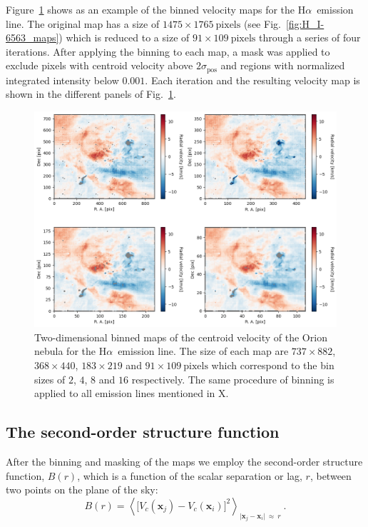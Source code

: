 \documentclass[fleqn,usenatbib, useAMS, a4paper]{mnras}
\newcommand\halpha{H${\alpha}$}
\newcommand\xx{\ensuremath{\boldsymbol{x}}}
\begin{document}
Figure~\ref{fig:figures/Ha_maps_comparison} shows as an example of the binned velocity maps for the \halpha\ emission line.
The original map has a size of \(1 475 \times1765 \ \text{pixels}\) (see Fig.~\ref{fig:H_I-6563_maps}) which is reduced to a size of \(91 \times 109 \ \text{pixels}\) through a series of four iterations.
After applying the binning to each map, a mask was applied to exclude pixels with centroid velocity above \(2\sigma_\text{pos}\) and regions with normalized integrated intensity below \(0.001\).
Each iteration and the resulting velocity map is shown in the different panels of Fig.~\ref{fig:figures/Ha_maps_comparison}.

\begin{figure}
 \centering
 \includegraphics[width=6.5in]{figures/Ha_maps_comparison.png}\par
 \caption{
 Two-dimensional binned maps of the centroid velocity of the Orion nebula for the \halpha\ emission line. The size of each map are \(737 \times 882\), \(368\times 440\), \(183 \times 219\)  and \(91 \times 109 \ \text{pixels}\) which correspond to the bin sizes of $2$, $4$, $8$ and $16$ respectively. The same procedure of binning is applied to all emission lines mentioned in X.  
 }
\label{fig:figures/Ha_maps_comparison}
\end{figure}

\subsection{The second-order structure function}
\label{sec:second-order-struct}

After the binning and masking of the maps we employ the second-order structure function, $B(r)$, which is a function of the scalar separation or lag, \(r\),
between two points on the plane of the sky:
%
\newcommand\Abs[1]{\vert #1\vert}
\begin{equation}\label{eq:Br}
  B(r) = \left\langle 
  \bigl[
  V_{c}(\xx_j) - V_{c}(\xx_i)
  \bigr]^{2} \right \rangle_{\Abs{\xx_j - \xx_i\!} \ \approx \ r} \ .
\end{equation}
\end{document}
